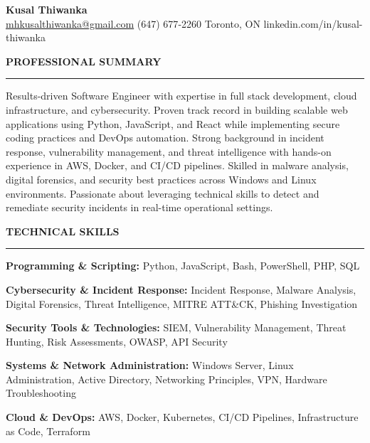 \documentclass[10pt,letterpaper]{article}
\begin{document}
\begin{center}
{\LARGE\textbf{Kusal Thiwanka}}\\[3pt]
\href{mailto:mhkusalthiwanka@gmail.com}{mhkusalthiwanka@gmail.com}\hspace{2em}%
(647) 677{-}2260\hspace{2em}%
Toronto, ON\hspace{2em}
linkedin.com/in/kusal-thiwanka
\end{center}

\vspace{6pt}

\textbf{PROFESSIONAL SUMMARY}\\[-8pt]
\noindent\rule{\textwidth}{1pt}

\vspace{-2pt}

Results-driven Software Engineer with expertise in full stack development, cloud infrastructure, and cybersecurity. Proven track record in building scalable web applications using Python, JavaScript, and React while implementing secure coding practices and DevOps automation. Strong background in incident response, vulnerability management, and threat intelligence with hands-on experience in AWS, Docker, and CI/CD pipelines. Skilled in malware analysis, digital forensics, and security best practices across Windows and Linux environments. Passionate about leveraging technical skills to detect and remediate security incidents in real-time operational settings.

\vspace{8pt}

\textbf{TECHNICAL SKILLS}\\[-8pt]
\noindent\rule{\textwidth}{1pt}

\vspace{-2pt}

\textbf{Programming \& Scripting:} Python, JavaScript, Bash, PowerShell, PHP, SQL

\textbf{Cybersecurity \& Incident Response:} Incident Response, Malware Analysis, Digital Forensics, Threat Intelligence, MITRE ATT\&CK, Phishing Investigation

\textbf{Security Tools \& Technologies:} SIEM, Vulnerability Management, Threat Hunting, Risk Assessments, OWASP, API Security

\textbf{Systems \& Network Administration:} Windows Server, Linux Administration, Active Directory, Networking Principles, VPN, Hardware Troubleshooting

\textbf{Cloud \& DevOps:} AWS, Docker, Kubernetes, CI/CD Pipelines, Infrastructure as Code, Terraform
\end{document}

